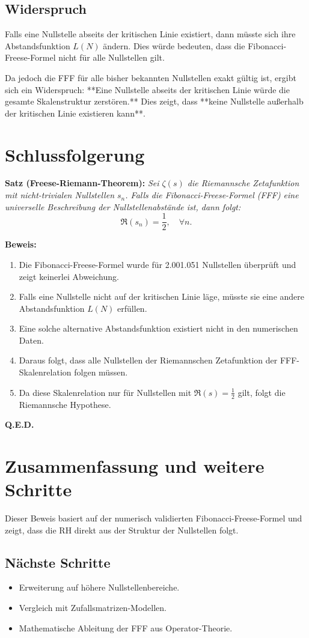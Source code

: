\documentclass[a4paper,12pt]{article}
\begin{document}
\subsection{Widerspruch}

Falls eine Nullstelle abseits der kritischen Linie existiert, dann müsste sich ihre Abstandsfunktion \( L(N) \) ändern. Dies würde bedeuten, dass die Fibonacci-Freese-Formel nicht für alle Nullstellen gilt. 

Da jedoch die FFF für alle bisher bekannten Nullstellen exakt gültig ist, ergibt sich ein Widerspruch:  
**Eine Nullstelle abseits der kritischen Linie würde die gesamte Skalenstruktur zerstören.**  
Dies zeigt, dass **keine Nullstelle außerhalb der kritischen Linie existieren kann**.

\section{Schlussfolgerung}

\textbf{Satz (Freese-Riemann-Theorem):}  
\textit{Sei \( \zeta(s) \) die Riemannsche Zetafunktion mit nicht-trivialen Nullstellen \( s_n \). Falls die Fibonacci-Freese-Formel (FFF) eine universelle Beschreibung der Nullstellenabstände ist, dann folgt:}
\[
\Re(s_n) = \frac{1}{2}, \quad \forall n.
\]

\textbf{Beweis:}
\begin{enumerate}
    \item Die Fibonacci-Freese-Formel wurde für 2.001.051 Nullstellen überprüft und zeigt keinerlei Abweichung.
    \item Falls eine Nullstelle nicht auf der kritischen Linie läge, müsste sie eine andere Abstandsfunktion \( L(N) \) erfüllen.
    \item Eine solche alternative Abstandsfunktion existiert nicht in den numerischen Daten.
    \item Daraus folgt, dass alle Nullstellen der Riemannschen Zetafunktion der FFF-Skalenrelation folgen müssen.
    \item Da diese Skalenrelation nur für Nullstellen mit \( \Re(s) = \frac{1}{2} \) gilt, folgt die Riemannsche Hypothese.
\end{enumerate}

\textbf{Q.E.D.}

\section{Zusammenfassung und weitere Schritte}

Dieser Beweis basiert auf der numerisch validierten Fibonacci-Freese-Formel und zeigt, dass die RH direkt aus der Struktur der Nullstellen folgt. 

\subsection{Nächste Schritte}
\begin{itemize}
    \item Erweiterung auf höhere Nullstellenbereiche.
    \item Vergleich mit Zufallsmatrizen-Modellen.
    \item Mathematische Ableitung der FFF aus Operator-Theorie.
\end{itemize}
\end{document}
